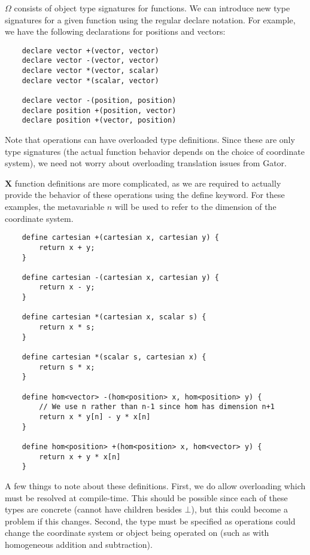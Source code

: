 \documentclass{article}
\newcommand{\Chi}{\mathbf{X}}
\begin{document}
$\Omega$ consists of object type signatures for functions.  We can introduce new type signatures for a given function using the regular \textsf{declare} notation.  For example, we have the following declarations for \textsf{positions} and \textsf{vectors}:

\begin{lstlisting}
	declare vector +(vector, vector)
	declare vector -(vector, vector)
	declare vector *(vector, scalar)
	declare vector *(scalar, vector)
	
	declare vector -(position, position)
	declare position +(position, vector)
	declare position +(vector, position)
\end{lstlisting}

Note that operations can have overloaded type definitions.  Since these are only type signatures (the actual function behavior depends on the choice of coordinate system), we need not worry about overloading translation issues from Gator.

$\Chi$ function definitions are more complicated, as we are required to actually provide the behavior of these operations using the \textsf{define} keyword.  For these examples, the metavariable $n$ will be used to refer to the dimension of the coordinate system.

\begin{lstlisting}
	define cartesian +(cartesian x, cartesian y) {
		return x + y;
	}
	
	define cartesian -(cartesian x, cartesian y) {
		return x - y;
	}
	
	define cartesian *(cartesian x, scalar s) {
		return x * s;
	}

	define cartesian *(scalar s, cartesian x) {
		return s * x;
	}
	
	define hom<vector> -(hom<position> x, hom<position> y) {
		// We use n rather than n-1 since hom has dimension n+1
		return x * y[n] - y * x[n]
	}
	
	define hom<position> +(hom<position> x, hom<vector> y) {
		return x + y * x[n]
	}
\end{lstlisting}

A few things to note about these definitions.  First, we do allow overloading which must be resolved at compile-time.  This should be possible since each of these types are concrete (cannot have children besides $\bot$), but this could become a problem if this changes.  Second, the type must be specified as operations could change the coordinate system or object being operated on (such as with homogeneous addition and subtraction).
\end{document}
